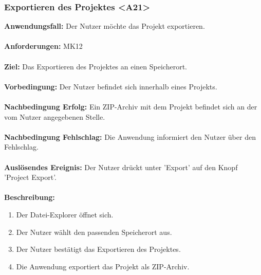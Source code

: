 \documentclass[parskip=full]{scrartcl} %
\begin{document}
\subsubsection*{Exportieren des Projektes <A21>}
\textbf{Anwendungsfall:} Der Nutzer möchte das Projekt exportieren. \\\\
\textbf{Anforderungen:} MK12\\\\
\textbf{Ziel:} Das Exportieren des Projektes an einen Speicherort.\\\\
\textbf{Vorbedingung:} Der Nutzer befindet sich innerhalb eines Projekts.\\\\
\textbf{Nachbedingung Erfolg:} Ein ZIP-Archiv mit dem Projekt befindet sich an der vom Nutzer angegebenen Stelle.\\\\
\textbf{Nachbedingung Fehlschlag:} Die Anwendung informiert den Nutzer über den Fehlschlag.\\\\
\textbf{Auslösendes Ereignis:}  Der Nutzer drückt unter 'Export' auf den Knopf 'Project Export'. \\\\
\textbf{Beschreibung:}
\begin{enumerate}
    \item Der Datei-Explorer öffnet sich.
    \item Der Nutzer wählt den passenden Speicherort aus.
    \item Der Nutzer bestätigt das Exportieren des Projektes.
    \item Die Anwendung exportiert das Projekt als ZIP-Archiv.
\end{enumerate}
\newpage
\end{document}

